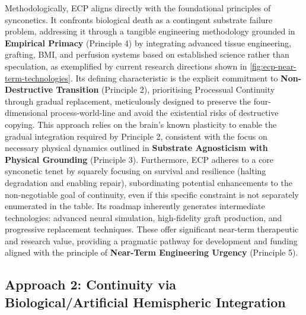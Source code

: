 \documentclass[10pt]{article}
\begin{document}
\begin{sloppypar}
  Methodologically, ECP aligns directly with the foundational principles of synconetics. It confronts biological death as a contingent substrate failure problem, addressing it through a tangible engineering methodology grounded in \textbf{Empirical Primacy} (Principle 4) by integrating advanced tissue engineering, grafting, BMI, and perfusion systems based on established science rather than speculation, as exemplified by current research directions shown in \autoref{fig:ecp-near-term-technologies}. Its defining characteristic is the explicit commitment to \textbf{Non-Destructive Transition} (Principle 2), prioritising Processual Continuity through gradual replacement, meticulously designed to preserve the four-dimensional process-world-line and avoid the existential risks of destructive copying. This approach relies on the brain’s known plasticity to enable the gradual integration required by Principle 2, consistent with the focus on necessary physical dynamics outlined in \textbf{Substrate Agnosticism with Physical Grounding} (Principle 3). Furthermore, ECP adheres to a core synconetic tenet by squarely focusing on survival and resilience (halting degradation and enabling repair), subordinating potential enhancements to the non-negotiable goal of continuity, even if this specific constraint is not separately enumerated in the table. Its roadmap inherently generates intermediate technologies: advanced neural simulation, high-fidelity graft production, and progressive replacement techniques. These offer significant near-term therapeutic and research value, providing a pragmatic pathway for development and funding aligned with the principle of \textbf{Near-Term Engineering Urgency} (Principle 5).

  \subsection[Approach 2: Continuity via Hemispheric Integration]{Approach 2: Continuity via Biological/Artificial Hemispheric Integration}
  \label{sec:chi}


\end{sloppypar}
\end{document}

